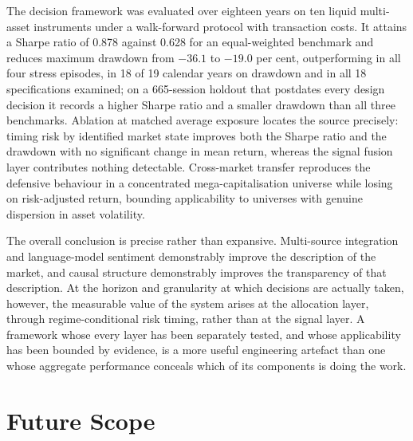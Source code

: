 The decision framework was evaluated over eighteen years on ten liquid multi-asset instruments
under a walk-forward protocol with transaction costs. It attains a Sharpe ratio of 0.878 against
0.628 for an equal-weighted benchmark and reduces maximum drawdown from $-36.1$ to $-19.0$ per
cent, outperforming in all four stress episodes, in 18 of 19 calendar years on drawdown and in
all 18 specifications examined; on a 665-session holdout that postdates every design decision it
records a higher Sharpe ratio and a smaller drawdown than all three benchmarks. Ablation at
matched average exposure locates the source precisely: timing risk by identified market state
improves both the Sharpe ratio and the drawdown with no significant change in mean return,
whereas the signal fusion layer contributes nothing detectable. Cross-market transfer reproduces
the defensive behaviour in a concentrated mega-capitalisation universe while losing on
risk-adjusted return, bounding applicability to universes with genuine dispersion in asset
volatility.

The overall conclusion is precise rather than expansive. Multi-source integration and
language-model sentiment demonstrably improve the description of the market, and causal
structure demonstrably improves the transparency of that description. At the horizon and
granularity at which decisions are actually taken, however, the measurable value of the system
arises at the allocation layer, through regime-conditional risk timing, rather than at the
signal layer. A framework whose every layer has been separately tested, and whose applicability
has been bounded by evidence, is a more useful engineering artefact than one whose aggregate
performance conceals which of its components is doing the work.

\section{Future Scope}

